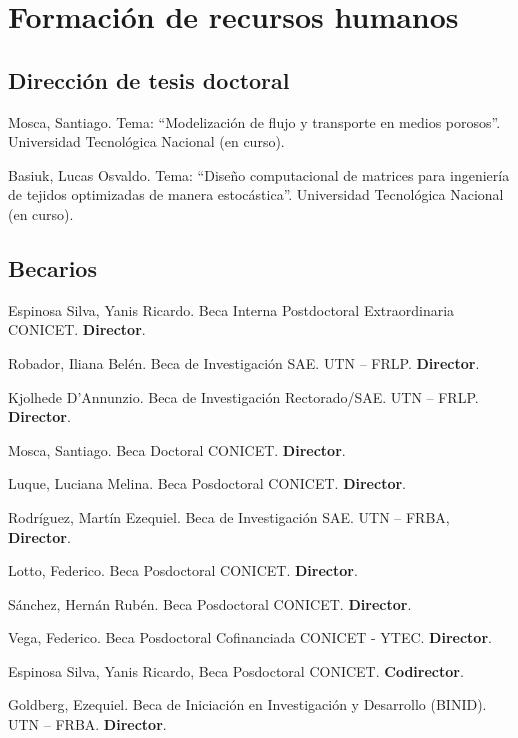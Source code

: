 \section{Formación de recursos humanos}

\subsection{Dirección de tesis doctoral}
 Mosca, Santiago. Tema: ``Modelización de flujo y transporte en medios porosos''. Universidad Tecnológica Nacional (en curso).

 Basiuk, Lucas Osvaldo. Tema: ``Diseño computacional de matrices para ingeniería de tejidos optimizadas de manera estocástica''. Universidad Tecnológica Nacional  (en curso).

\subsection{Becarios}

     Espinosa Silva, Yanis Ricardo. Beca Interna Postdoctoral Extraordinaria CONICET. \textbf{Director}.

     Robador, Iliana Belén. Beca de Investigación SAE. UTN -- FRLP. \textbf{Director}.

     Kjolhede D'Annunzio. Beca de Investigación Rectorado/SAE. UTN -- FRLP. \textbf{Director}.

     Mosca, Santiago. Beca Doctoral CONICET. \textbf{Director}.

     Luque, Luciana Melina. Beca Posdoctoral CONICET. \textbf{Director}.

     Rodríguez, Martín Ezequiel. Beca de Investigación SAE. UTN -- FRBA, \textbf{Director}.

     Lotto, Federico. Beca Posdoctoral CONICET. \textbf{Director}.

     Sánchez, Hernán Rubén. Beca Posdoctoral CONICET. \textbf{Director}.

     Vega, Federico. Beca Posdoctoral Cofinanciada CONICET - YTEC. \textbf{Director}.

     Espinosa Silva, Yanis Ricardo, Beca Posdoctoral CONICET. \textbf{Codirector}.

     Goldberg, Ezequiel. Beca de Iniciación en Investigación y Desarrollo (BINID). UTN -- FRBA. \textbf{Director}.

